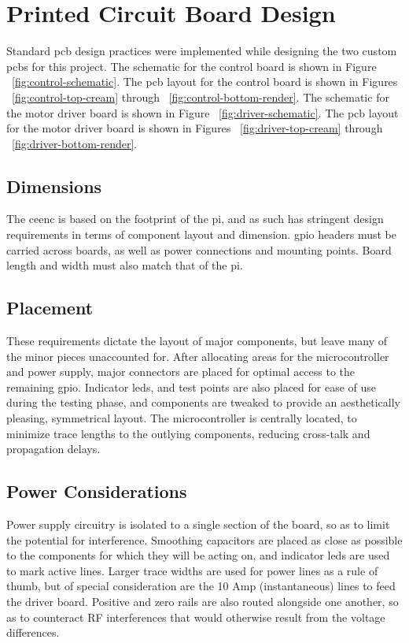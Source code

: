 \newpage
\section{Printed Circuit Board Design}
Standard \gls{pcb} design practices were implemented while designing the two custom \gls{pcb}s for this project.
The schematic for the control board is shown in  Figure ~\ref{fig:control-schematic}.
The \gls{pcb} layout for the control board is shown in Figures ~\ref{fig:control-top-cream} through ~\ref{fig:control-bottom-render}.
The schematic for the motor driver board is shown in  Figure ~\ref{fig:driver-schematic}.
The \gls{pcb} layout for the motor driver board is shown in Figures ~\ref{fig:driver-top-cream} through ~\ref{fig:driver-bottom-render}.

\subsection{Dimensions}
The \gls{ceenc} is based on the footprint of the \gls{pi}, and as such has stringent design requirements in terms of component layout and dimension.
\gls{gpio} headers must be carried across boards, as well as power connections and mounting points. Board length and width must also match that of the \gls{pi}. 

\subsection{Placement}
These requirements dictate the layout of major components, but leave many of the minor pieces unaccounted for.
After allocating areas for the microcontroller and power supply, major connectors are placed for optimal access to the remaining \gls{gpio}.
Indicator \gls{led}s, and test points are also placed for ease of use during the testing phase, and components are tweaked to provide an aesthetically pleasing, symmetrical layout.
The microcontroller is centrally located, to minimize trace lengths to the outlying components, reducing cross-talk and propagation delays.

\subsection{Power Considerations}
Power supply circuitry is isolated to a single section of the board, so as to limit the potential for interference.
Smoothing capacitors are placed as close as possible to the components for which they will be acting on, and indicator \gls{led}s are used to mark active lines.
Larger trace widths are used for power lines as a rule of thumb, but of special consideration are the 10 Amp (instantaneous) lines to feed the driver board.
Positive and zero rails are also routed alongside one another, so as to counteract RF interferences that would otherwise result from the voltage differences.
